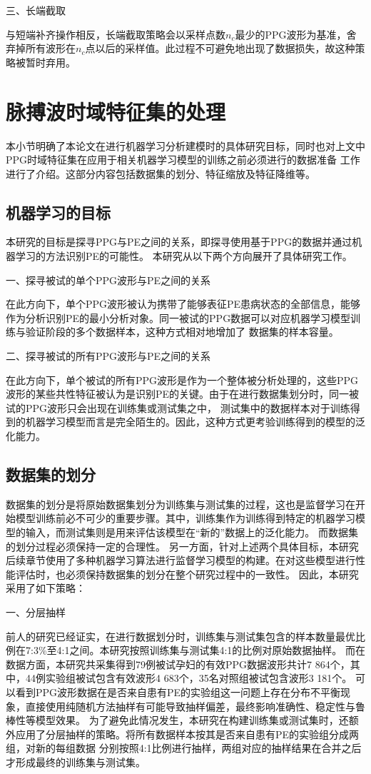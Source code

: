 三、长端截取

与短端补齐操作相反，长端截取策略会以采样点数$n_c$最少的PPG波形为基准，舍弃掉所有波形在$n_c$点以后的采样值。此过程不可避免地出现了数据损失，故这种策略被暂时弃用。

\section{脉搏波时域特征集的处理}
本小节明确了本论文在进行机器学习分析建模时的具体研究目标，同时也对上文中PPG时域特征集在应用于相关机器学习模型的训练之前必须进行的数据准备
工作进行了介绍。这部分内容包括数据集的划分、特征缩放及特征降维等。
\subsection{机器学习的目标}
本研究的目标是探寻PPG与PE之间的关系，即探寻使用基于PPG的数据并通过机器学习的方法识别PE的可能性。
本研究从以下两个方向展开了具体研究工作。

一、探寻被试的单个PPG波形与PE之间的关系

在此方向下，单个PPG波形被认为携带了能够表征PE患病状态的全部信息，能够作为分析识别PE的最小分析对象。同一被试的PPG数据可以对应机器学习模型训练与验证阶段的多个数据样本，这种方式相对地增加了
数据集的样本容量。

二、探寻被试的所有PPG波形与PE之间的关系

在此方向下，单个被试的所有PPG波形是作为一个整体被分析处理的，这些PPG波形的某些共性特征被认为是识别PE的关键。由于在进行数据集划分时，同一被试的PPG波形只会出现在训练集或测试集之中，
测试集中的数据样本对于训练得到的机器学习模型而言是完全陌生的。因此，这种方式更考验训练得到的模型的泛化能力。

\subsection{数据集的划分}
数据集的划分是将原始数据集划分为训练集与测试集的过程，这也是监督学习在开始模型训练前必不可少的重要步骤。其中，训练集作为训练得到特定的机器学习模型的输入，而测试集则是用来评估该模型在“新的”数据上的泛化能力。
而数据集的划分过程必须保持一定的合理性。
另一方面，针对上述两个具体目标，本研究后续章节使用了多种机器学习算法进行监督学习模型的构建。在对这些模型进行性能评估时，也必须保持数据集的划分在整个研究过程中的一致性。
因此，本研究采用了如下策略：

一、分层抽样

前人的研究已经证实，在进行数据划分时，训练集与测试集包含的样本数量最优比例在7:3\%至4:1之间\cite{Gholamy2018Why7O}。本研究按照训练集与测试集4:1的比例对原始数据抽样。
而在数据方面，本研究共采集得到79例被试孕妇的有效PPG数据波形共计7 864个，其中，44例实验组被试包含有效波形4 683个，35名对照组被试包含波形3 181个。
可以看到PPG波形数据在是否来自患有PE的实验组这一问题上存在分布不平衡现象，直接使用纯随机方法抽样有可能导致抽样偏差，最终影响准确性、稳定性与鲁棒性等模型效果\cite{Aurélien2018}。
为了避免此情况发生，本研究在构建训练集或测试集时，还额外应用了分层抽样的策略。将所有数据样本按其是否来自患有PE的实验组分成两组，对新的每组数据
分别按照4:1比例进行抽样，两组对应的抽样结果在合并之后才形成最终的训练集与测试集。

